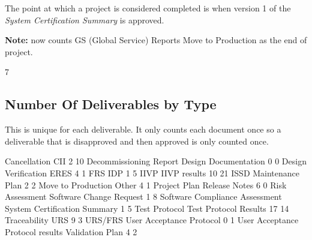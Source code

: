 \documentclass{article}
\begin{document}
The point at which a project is considered completed is when version 1 of the
\textit{System Certification Summary} is approved.

\textbf{Note:} now counts GS (Global Service) Reports Move to Production as the end
of project.

\begin{Schunk}
\begin{Soutput}
[1] 7
\end{Soutput}
\end{Schunk}


\subsection{Number Of Deliverables by Type}
This is unique for each deliverable. It only counts each document once so a deliverable
that is disapproved and then approved is only counted once.

\begin{Schunk}
\begin{Soutput}
                    Cancellation                              CII
                               2                               10
          Decommissioning Report             Design Documentation
                               0                                0
             Design Verification                             ERES
                               4                                1
                             FRS                              IDP
                               1                                5
                            IIVP                     IIVP results
                              10                               21
                            ISSD                 Maintenance Plan
                               2                                2
              Move to Production                            Other
                               4                                1
                    Project Plan                    Release Notes
                               6                                0
                 Risk Assessment          Software Change Request
                               1                                8
  Software Compliance Assessment     System Certification Summary
                               1                                5
                   Test Protocol            Test Protocol Results
                              17                               14
                    Traceability                              URS
                               9                                3
                         URS/FRS         User Acceptance Protocol
                               0                                1
User Acceptance Protocol results                  Validation Plan
                               4                                2
\end{Soutput}
\end{Schunk}
\end{document}
